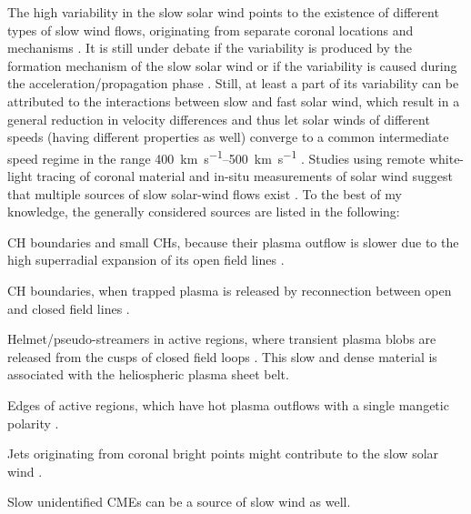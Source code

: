 The high variability in the slow solar wind points to the existence of different types of slow wind flows, originating from separate coronal locations and mechanisms \citep{Schwenn1983}. It is still under debate if the variability is produced by the formation mechanism of the slow solar wind or if the variability is caused during the acceleration/propagation phase \citep{Sanchez-Diaz2016}. Still, at least a part of its variability can be attributed to the interactions between slow and fast solar wind, which result in a general reduction in velocity differences and thus let solar winds of different speeds (having different properties as well) converge to a common intermediate speed regime in the range \SIrange{400}{500}{\km\per\s} \citep{McGregor2011a,Sanchez-Diaz2016}. Studies using remote white-light tracing of coronal material and in-situ measurements of solar wind suggest that multiple sources of slow solar-wind flows exist \citep{Wang2000,Kilpua2016}. To the best of my knowledge, the generally considered sources are listed in the following:
\begin{itemize*}
	\item CH boundaries and small CHs, because their plasma outflow is slower due to the high superradial expansion of its open field lines \citep{Wang1990}.
	\item CH boundaries, when trapped plasma is released by reconnection between open and closed field lines \citep{Madjarska2004}.
	\item Helmet/pseudo-streamers in active regions, where transient plasma blobs are released from the cusps of closed field loops \citep{Wang1998,Wang2000}. This slow and dense material is associated with the heliospheric plasma sheet belt.
	\item Edges of active regions, which have hot plasma outflows with a single mangetic polarity \citep{Kojima1999}.
	\item Jets originating from coronal bright points might contribute to the slow solar wind \citep{Subramanian2010}.
	\item Slow unidentified CMEs can be a source of slow wind as well.
\end{itemize*}

